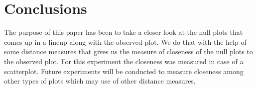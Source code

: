 \documentclass[12]{report}
\begin{document}
\section{Conclusions} \label{sec:conclusions}
The purpose of this paper has been to take a closer look at the null plots that comes up in a lineup along with the observed plot. We do that with the help of some distance measures that gives us the measure of closeness of the null plots to the observed plot. For this experiment the closeness was measured in case of a scatterplot. Future experiments will be conducted to measure closeness among other types of plots which may use of other distance measures.

\end{document}
